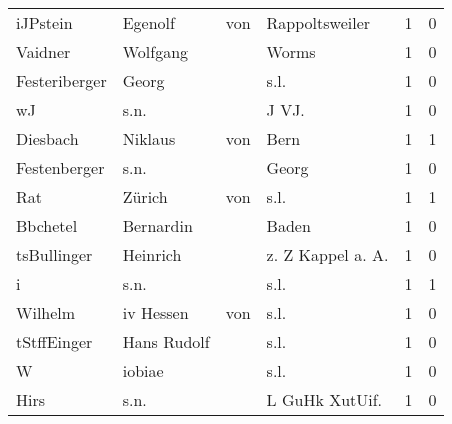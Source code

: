 \begin{tabular}{llllrr}
                 iJPstein &                            Egenolf &         von &                              Rappoltsweiler &          1 &         0 \\
                  Vaidner &                           Wolfgang &             &                                       Worms &          1 &         0 \\
            Festeriberger &                              Georg &             &                                        s.l. &          1 &         0 \\
                       wJ &                               s.n. &             &                                      J VJ.  &          1 &         0 \\
                 Diesbach &                            Niklaus &         von &                                        Bern &          1 &         1 \\
             Festenberger &                               s.n. &             &                                       Georg &          1 &         0 \\
                      Rat &                             Zürich &         von &                                        s.l. &          1 &         1 \\
                 Bbchetel &                          Bernardin &             &                                       Baden &          1 &         0 \\
              tsBullinger &                           Heinrich &             &                          z. Z Kappel a. A.  &          1 &         0 \\
                        i &                               s.n. &             &                                        s.l. &          1 &         1 \\
                  Wilhelm &                         iv  Hessen &         von &                                        s.l. &          1 &         0 \\
              tStffEinger &                        Hans Rudolf &             &                                        s.l. &          1 &         0 \\
                        W &                             iobiae &             &                                        s.l. &          1 &         0 \\
                     Hirs &                               s.n. &             &                             L GuHk XutUif.  &          1 &         0 \\

\end{tabular}
